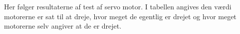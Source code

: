Her følger resultaterne af test af \legos servo motor.
I tabellen angives den værdi motorerne er sat til at dreje, hvor meget de egentlig er drejet og hvor meget motorerne selv angiver at de er drejet.

